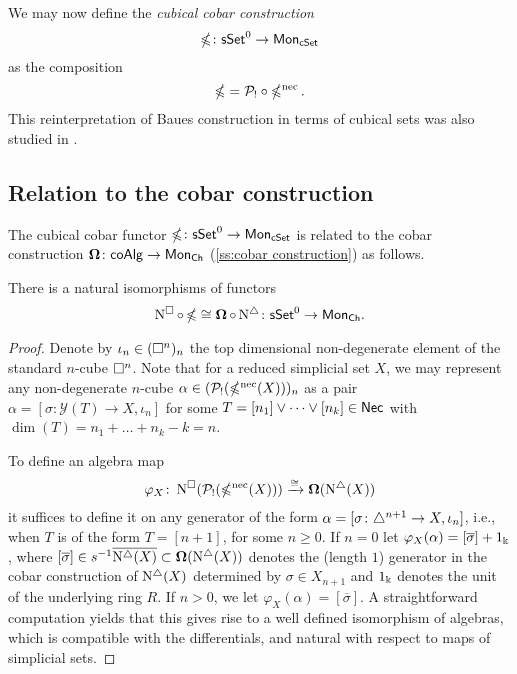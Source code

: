 
We may now define the \textit{cubical cobar construction}
$$\operatorname{\mathbb{\Omega}} \colon \mathsf{sSet}^0 \to \mathsf{Mon}_{\mathsf{cSet}}$$ as the composition $$\operatorname{\mathbb{\Omega}}= \mathcal{P}_! \circ \operatorname{\mathbb{\Omega}^{\mathrm{nec}}}.$$ This reinterpretation of Baues construction in terms of cubical sets was also studied in \cite{rivera2018cubical}.

\subsection{Relation to the cobar construction}

The cubical cobar functor $\operatorname{\mathbb{\Omega}} \colon \mathsf{sSet}^0 \to \mathsf{Mon}_{\mathsf{cSet}}$ is related to the cobar construction $\operatorname{\mathbf{\Omega}} \colon \mathsf{coAlg} \to \mathsf{Mon}_{\mathsf{Ch}}$ (\cref{ss:cobar construction}) as follows.

\begin{lemma} \label{l:ccobar and cobar}
	There is a natural isomorphisms of functors 
	\begin{equation*}
	\operatorname{N^{\square}} \circ \operatorname{\mathbb{\Omega}} \cong \operatorname{\mathbf{\Omega}} \circ \operatorname{N^{\triangle}} \colon \mathsf{sSet}^0 \to \mathsf{Mon}_{\mathsf{Ch}}.
	\end{equation*}
\end{lemma}

\begin{proof} 
	Denote by $\iota_n \in (\square^n)_n$ the top dimensional non-degenerate element of the standard $n$-cube $\square^n$.
	Note that for a reduced simplicial set $X$, we may represent any non-degenerate $n$-cube $\alpha \in (\mathcal{P}_!(\operatorname{\mathbb{\Omega}^{\mathrm{nec}}}(X)))_n$ as a pair $\alpha = [\sigma \colon \mathcal{Y}(T) \to X, \iota_n]$ for some $T = [n_1] \vee \dots \vee [n_k] \in \mathsf{Nec}$ with $\dim(T) = n_1 + \dots + n_k-k = n$.
	
	To define an algebra map
	\begin{equation*}
	\varphi_X \colon \operatorname{N^{\square}}(\mathcal{P}_!(\operatorname{\mathbb{\Omega}^{\mathrm{nec}}}(X))) \xrightarrow{\cong} \operatorname{\mathbf{\Omega}}(\operatorname{N^{\triangle}}(X))
	\end{equation*}
	it suffices to define it on any generator of the form $\alpha=[\sigma \colon \triangle^{n+1} \to X, \iota_{n}]$, i.e., when $T$ is of the form $T=[n+1]$, for some $n\geq0$.
	If $n = 0$ let $\varphi_X(\alpha)= [\overline{\sigma}] + 1_\Bbbk$, where $[\overline{\sigma}] \in s^{-1} \overline{ \operatorname{N^{\triangle}}(X)} \subset \operatorname{\mathbf{\Omega}}(\operatorname{N^{\triangle}}(X))$ denotes the (length $1$) generator in the cobar construction of $\operatorname{N^{\triangle}}(X)$ determined by $\sigma \in X_{n+1}$ and $1_\Bbbk$ denotes the unit of the underlying ring $R$.
	If $n>0$, we let $\varphi_X(\alpha)=[\overline{\sigma}]$.
	A straightforward computation yields that this gives rise to a well defined isomorphism of algebras, which is compatible with the differentials, and natural with respect to maps of simplicial sets.
\end{proof}

